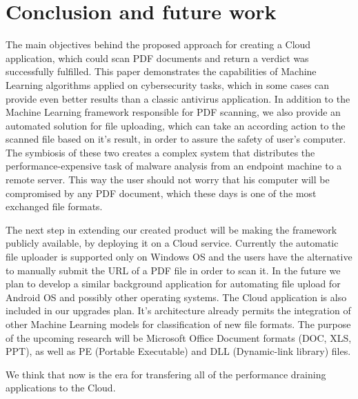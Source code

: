 \chapter{Conclusion and future work}
\label{chapter:conclusion}

The main objectives behind the proposed approach for creating a Cloud application, which could scan PDF documents and return a verdict was successfully fulfilled. This paper demonstrates the capabilities of Machine Learning algorithms applied on cybersecurity tasks, which in some cases can provide even better results than a classic antivirus application. In addition to the Machine Learning framework responsible for PDF scanning, we also provide an automated solution for file uploading, which can take an according action to the scanned file based on it's result, in order to assure the safety of user's computer. The symbiosis of these two creates a complex system that distributes the performance-expensive task of malware analysis from an endpoint machine to a remote server. This way the user should not worry that his computer will be compromised by any PDF document, which these days is one of the most exchanged file formats. \par 
The next step in extending our created product will be making the framework publicly available, by deploying it on a Cloud service. Currently the automatic file uploader is supported only on Windows OS and the users have the alternative to manually submit the URL of a PDF file in order to scan it. In the future we plan to develop a similar background application for automating file upload for Android OS and possibly other operating systems. The Cloud application is also included in our upgrades plan. It's architecture already permits the integration of other Machine Learning models for classification of new file formats. The purpose of the upcoming research will be Microsoft Office Document formats (DOC, XLS, PPT), as well as PE (Portable Executable) and DLL (Dynamic-link library) files. \par
We think that now is the era for transfering all of the performance draining applications to the Cloud.